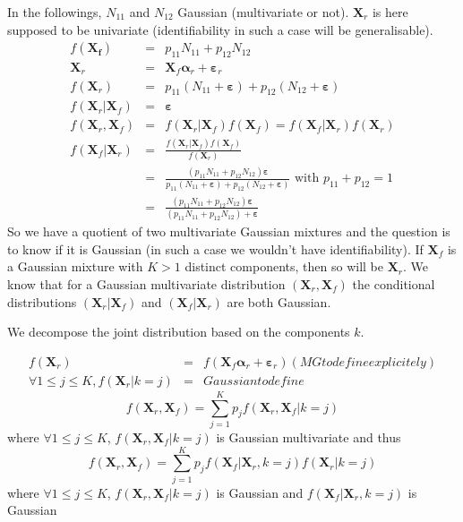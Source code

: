 \documentclass[11pt,a4paper]{article}
\begin{document}
	In the followings, $N_{11}$ and $N_{12}$ Gaussian (multivariate or not). $\boldsymbol{X}_r$ is here supposed to be univariate (identifiability in such a case will be generalisable).
		\begin{eqnarray}
			f(\boldsymbol{X_f})&=& p_{11} N_{11}+p_{12}N_{12}\\
			\boldsymbol{X}_r&=&\boldsymbol{X}_f\boldsymbol{\alpha}_r +\boldsymbol{\varepsilon}_r \\
			f(\boldsymbol{X}_r)&=&p_{11}(N_{11}+\boldsymbol{\varepsilon})+p_{12}(N_{12}+\boldsymbol{\varepsilon}) \\
			f(\boldsymbol{X}_r|\boldsymbol{X}_f)&=&\boldsymbol{\varepsilon}\\
			f(\boldsymbol{X}_r,\boldsymbol{X}_f)&=&f(\boldsymbol{X}_r|\boldsymbol{X}_f)f(\boldsymbol{X}_f)=f(\boldsymbol{X}_f|\boldsymbol{X}_r)f(\boldsymbol{X}_r) \\
			f(\boldsymbol{X}_f|\boldsymbol{X}_r)&=&\frac{f(\boldsymbol{X}_r|\boldsymbol{X}_f)f(\boldsymbol{X}_f)}{f(\boldsymbol{X}_r)} \\
			&=&\frac{(p_{11} N_{11}+p_{12}N_{12})\boldsymbol{\varepsilon}}{p_{11}(N_{11}+\boldsymbol{\varepsilon})+p_{12}(N_{12}+\boldsymbol{\varepsilon})} \textrm{ with }p_{11}+p_{12}=1\\
			&=&\frac{(p_{11} N_{11}+p_{12}N_{12})\boldsymbol{\varepsilon}}{(p_{11} N_{11}+p_{12}N_{12})+\boldsymbol{\varepsilon}}
		\end{eqnarray}
	So we have a quotient of two multivariate Gaussian mixtures and the question is to know if it is Gaussian (in such a case we wouldn't have identifiability).
If $\boldsymbol{X}_f$ is a Gaussian mixture with $K>1$ distinct components, then so will be $\boldsymbol{X}_r$.
	We know that for a Gaussian multivariate distribution $(\boldsymbol{X}_r,\boldsymbol{X}_f)$ the conditional distributions $(\boldsymbol{X}_r|\boldsymbol{X}_f)$ and $(\boldsymbol{X}_f|\boldsymbol{X}_r)$ are both Gaussian. 
	
	
	
		We decompose the joint distribution based on the components $k$.

	\begin{eqnarray}
			f(\boldsymbol{X}_r)&=&f(\boldsymbol{X}_f\boldsymbol{\alpha}_r +\boldsymbol{\varepsilon}_r) (MG to define explicitely) \\
			\forall 1\leq j \leq K,  f(\boldsymbol{X}_r|k=j)&=& Gaussian to define
			\end{eqnarray}
		\begin{equation}
			f(\boldsymbol{X}_r,\boldsymbol{X}_f)= \sum_{j=1}^K p_jf(\boldsymbol{X}_r,\boldsymbol{X}_f|k=j)
	\end{equation}
			where  $\forall 1\leq j \leq K$, $ f(\boldsymbol{X}_r,\boldsymbol{X}_f|k=j)$  is Gaussian multivariate  and thus
			\begin{equation}
			f(\boldsymbol{X}_r,\boldsymbol{X}_f)= \sum_{j=1}^K p_jf(\boldsymbol{X}_f|\boldsymbol{X}_r,k=j)f(\boldsymbol{X}_r|k=j)
	\end{equation}
				where  $\forall 1\leq j \leq K$, $ f(\boldsymbol{X}_r,\boldsymbol{X}_f|k=j)$  is Gaussian and $f(\boldsymbol{X}_f|\boldsymbol{X}_r,k=j)$ is Gaussian
				
\end{document}
